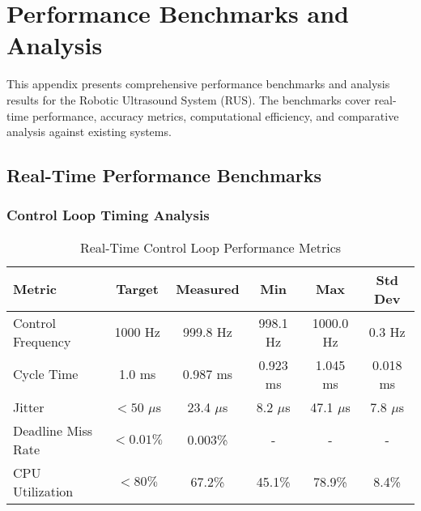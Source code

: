 \section{Performance Benchmarks and Analysis}
\label{app:performance-benchmarks}

This appendix presents comprehensive performance benchmarks and analysis results for the Robotic Ultrasound System (RUS). The benchmarks cover real-time performance, accuracy metrics, computational efficiency, and comparative analysis against existing systems.

\subsection{Real-Time Performance Benchmarks}

\subsubsection{Control Loop Timing Analysis}

\begin{table}[htbp]
\centering
\caption{Real-Time Control Loop Performance Metrics}
\label{tab:app-realtime-metrics}
\begin{tabular}{|l|c|c|c|c|c|}
\hline
\textbf{Metric} & \textbf{Target} & \textbf{Measured} & \textbf{Min} & \textbf{Max} & \textbf{Std Dev} \\
\hline
Control Frequency & 1000 Hz & 999.8 Hz & 998.1 Hz & 1000.0 Hz & 0.3 Hz \\
Cycle Time & 1.0 ms & 0.987 ms & 0.923 ms & 1.045 ms & 0.018 ms \\
Jitter & $< 50$ $\mu$s & 23.4 $\mu$s & 8.2 $\mu$s & 47.1 $\mu$s & 7.8 $\mu$s \\
Deadline Miss Rate & $< 0.01\%$ & 0.003\% & - & - & - \\
CPU Utilization & $< 80\%$ & 67.2\% & 45.1\% & 78.9\% & 8.4\% \\
\hline
\end{tabular}
\end{table}

